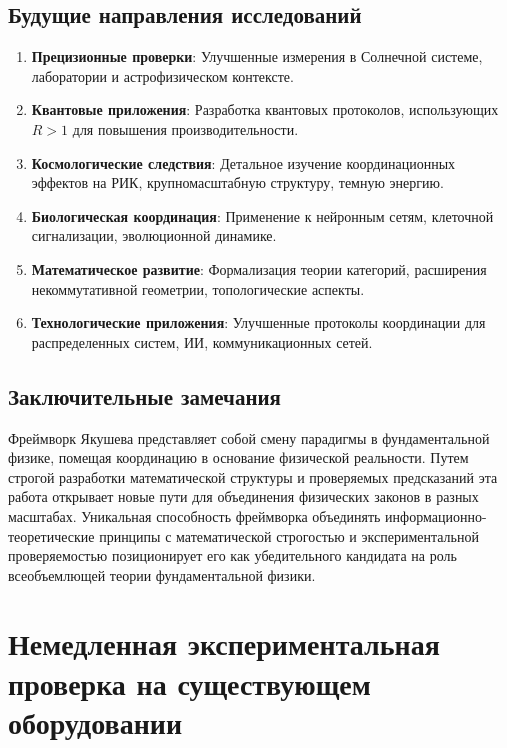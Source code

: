 \documentclass[11pt,a4paper]{article}
\begin{document}
	\subsection{Будущие направления исследований}
	
	\begin{enumerate}
		\item \textbf{Прецизионные проверки}: Улучшенные измерения в Солнечной системе, лаборатории и астрофизическом контексте.
		
		\item \textbf{Квантовые приложения}: Разработка квантовых протоколов, использующих $R>1$ для повышения производительности.
		
		\item \textbf{Космологические следствия}: Детальное изучение координационных эффектов на РИК, крупномасштабную структуру, темную энергию.
		
		\item \textbf{Биологическая координация}: Применение к нейронным сетям, клеточной сигнализации, эволюционной динамике.
		
		\item \textbf{Математическое развитие}: Формализация теории категорий, расширения некоммутативной геометрии, топологические аспекты.
		
		\item \textbf{Технологические приложения}: Улучшенные протоколы координации для распределенных систем, ИИ, коммуникационных сетей.
	\end{enumerate}
	
	\subsection{Заключительные замечания}
	
	Фреймворк Якушева представляет собой смену парадигмы в фундаментальной физике, помещая координацию в основание физической реальности. Путем строгой разработки математической структуры и проверяемых предсказаний эта работа открывает новые пути для объединения физических законов в разных масштабах. Уникальная способность фреймворка объединять информационно-теоретические принципы с математической строгостью и экспериментальной проверяемостью позиционирует его как убедительного кандидата на роль всеобъемлющей теории фундаментальной физики.
	\section{Немедленная экспериментальная проверка на существующем оборудовании}
	\label{sec:immediate-verification}
	
\end{document}
